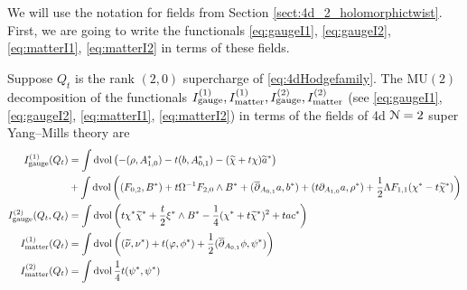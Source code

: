 \documentclass[10pt, oneside]{article}
\newcommand{\MU}{\mathrm{MU}}
\begin{document}
We will use the notation for fields from Section \ref{sect:4d_2_holomorphictwist}. First, we are going to write the functionals \eqref{eq:gaugeI1}, \eqref{eq:gaugeI2}, \eqref{eq:matterI1}, \eqref{eq:matterI2} in terms of these fields.

\begin{prop}
Suppose $Q_t$ is the rank $(2,0)$ supercharge of \ref{eq:4dHodgefamily}.
The $\MU(2)$ decomposition of the functionals $I_{\rm gauge}^{(1)}, I^{(1)}_{\rm matter}, I^{(2)}_{\rm gauge}, I^{(2)}_{\rm matter}$ (see \eqref{eq:gaugeI1},  \eqref{eq:gaugeI2}, \eqref{eq:matterI1}, \eqref{eq:matterI2}) in terms of the fields of 4d $\mathcal N=2$ super Yang--Mills theory are
\begin{align*}
I_{\rm gauge}^{(1)}(Q_t) &= \int \operatorname{dvol}\left(-(\rho, A_{1, 0}^*) - t(b, A_{0, 1}^*) - (\widetilde{\chi} + t\chi)\widetilde{a}^*\right) \\
&+ \int\operatorname{dvol}\left((F_{0, 2}, B^*) + t\Omega^{-1} F_{2, 0}\wedge B^* + (\overline{\partial}_{A_{0, 1}}a, b^*) + (t\partial_{A_{1, 0}} a, \rho^*) + \frac{1}{2}\Lambda F_{1, 1}(\chi^* - t\widetilde{\chi}^*)\right) \\
I^{(2)}_{\rm gauge} (Q_t, Q_t) &= \int \operatorname{dvol} \left(t\chi^*\widetilde{\chi}^* + \frac{t}{2} \xi^*\wedge B^* -\frac{1}{4}(\chi^* + t\widetilde{\chi}^*)^2 + t a c^*\right) \\
I_{\rm matter}^{(1)}(Q_t) &= \int \operatorname{dvol} \left((\widetilde{\nu}, \nu^*) + t (\varphi, \phi^*) + \frac{1}{2} (\overline{\partial}_{A_{0,1}} \phi, \psi^*) \right) \\
I_{\rm matter}^{(2)}(Q_t) &= \int \operatorname{dvol} \frac 14 t (\psi^*, \psi^*)
\end{align*}
\end{prop}
\end{document}
